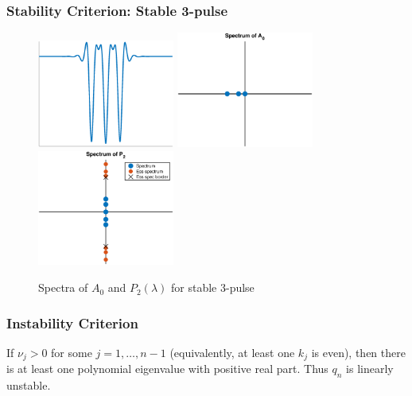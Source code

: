 \documentclass[16pt]{beamer}
\begin{document}
\begin{frame}
\frametitle{Stability Criterion: Stable 3-pulse}
\begin{figure}
\begin{center}
\includegraphics[width=4.5cm]{images/stable2.eps}
\includegraphics[width=4.5cm]{images/stable2A0.eps}
\includegraphics[width=4.5cm]{images/stable2spec.eps}
\caption{Spectra of $A_0$ and $P_2(\lambda)$ for stable 3-pulse}
\end{center}
\end{figure}
\end{frame}

\begin{frame}
\frametitle{Instability Criterion}
\begin{corollary}[Kapitula et al., 2019]If $\nu_j > 0$ for some $j = 1, \dots, n-1$ (equivalently, at least one $k_j$ is even), then there is at least one polynomial eigenvalue with positive real part. Thus $q_n$ is linearly unstable.
\end{corollary}
\end{frame}
\end{document}
